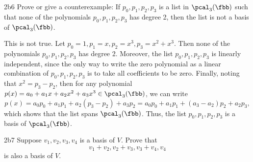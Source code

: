 \begin{exercise}{2b6}
    Prove or give a counterexample: If $p_0, p_1, p_2, p_3$ is a list in $\pcal_3(\fbb)$ such that none of the polynomials $p_0, p_1, p_2, p_3$ has degree 2, then the list is not a basis of $\pcal_3(\fbb)$.
\end{exercise}

\begin{sol}
    This is not true.
	Let $p_0 = 1, p_1 = x, p_2 = x^3, p_3 = x^2 + x^3$.
	Then none of the polynomials $p_0, p_1, p_2, p_3$ has degree 2.
	Moreover, the list $p_0, p_1, p_2, p_3$ is linearly independent, since the only way to write the zero polynomial as a linear combination of $p_0, p_1, p_2, p_3$ is to take all coefficients to be zero.
	Finally, noting that $x^2 = p_3 - p_2$, then for any polynomial $p(x) = a_0 + a_1 x + a_2 x^2 + a_3 x^3 \in \pcal_3(\fbb)$, we can write
    \[
    	p(x) = a_0 p_0 + a_1 p_1 + a_2 (p_3 - p_2) + a_3 p_2 = a_0 p_0 + a_1 p_1 + (a_3 - a_2)p_2 + a_2 p_3,
    \]
    which shows that the list spans $\pcal_3(\fbb)$.
	Thus, the list $p_0, p_1, p_2, p_3$ is a basis of $\pcal_3(\fbb)$.
\end{sol}

\begin{exercise}{2b7}
    Suppose $v_1, v_2, v_3, v_4$ is a basis of $V$.
	Prove that
    \[
    	v_1 + v_2, v_2 + v_3, v_3 + v_4, v_4
    \]
    is also a basis of $V$.

\end{exercise}

